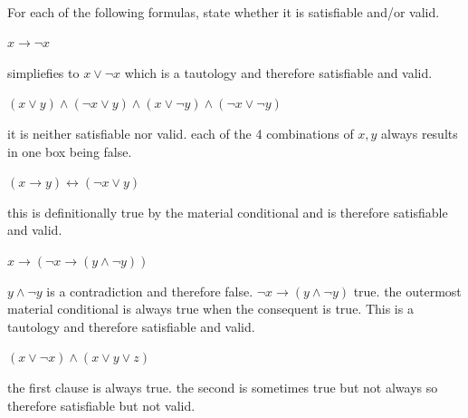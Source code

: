 \documentclass[11pt]{article}
\begin{document}
\begin{qunlist}
\begin{qparts}
\begin{answer}
    \end{answer}
  \end{qparts}

  \\
  For each of the following formulas, state whether it is satisfiable and/or valid.
  \begin{qparts}
  \item
    $x \rightarrow \lnot x$

    \begin{answer}
      simpliefies to \(x\lor \neg x\) which is a tautology and therefore satisfiable and valid.
    \end{answer}

  \item
    $(x \lor y) \land (\lnot x \lor y) \land (x \lor \lnot y) \land (\lnot x \lor \lnot y)$

    \begin{answer}
      it is neither satisfiable nor valid. each of the 4 combinations of \(x,y\) always results in one box being false.
    \end{answer}

  \item
    $(x \rightarrow y) \leftrightarrow (\lnot x \lor y)$

    \begin{answer}
      this is definitionally true  by the material conditional and is therefore satisfiable and valid.
    \end{answer}

  \item
    $x \rightarrow (\lnot x \rightarrow (y \land \lnot y))$

    \begin{answer}
      \(y\land \neg y\) is a contradiction and therefore false. \(\lnot x \rightarrow (y \land \lnot y)\) true. the outermost material conditional is always true when the consequent is true.
      This is a tautology and therefore satisfiable and valid.
    \end{answer}

  \item
    $(x \lor \lnot x) \land (x \lor y \lor z)$

    \begin{answer}
      the first clause is always true. the second is sometimes true but not always so therefore satisfiable but not valid.

    \end{answer}
  \end{qparts}


\end{qunlist}
\end{document}
